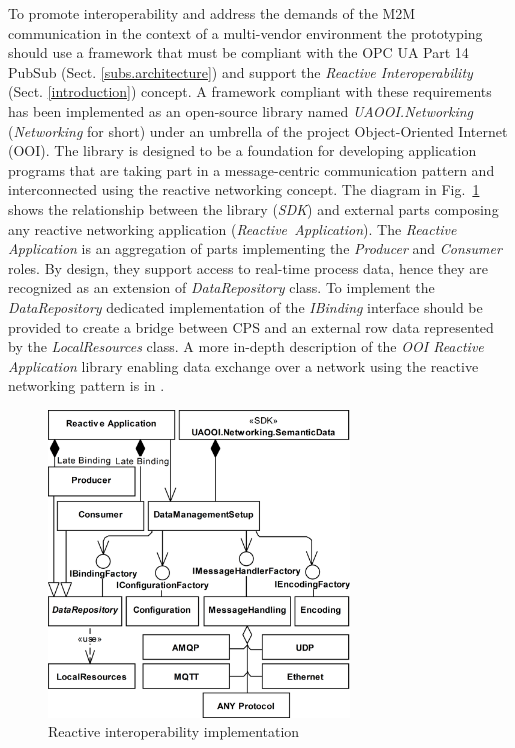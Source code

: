 \documentclass{article}
\begin{document}
To promote interoperability and address the demands of the M2M communication in the context of a multi-vendor environment the prototyping should use a framework that must be compliant with the OPC UA Part 14 PubSub (Sect. \ref{subs.architecture}) and support the \emph{Reactive Interoperability} (Sect. \ref{introduction}) concept. A framework compliant with these requirements has been implemented as an open-source library named \emph{UAOOI.Networking} (\emph{Networking} for short) under an umbrella of the project Object-Oriented Internet  (OOI)\cite{mariusz_postol_2020_4361640}. The library is designed to be a foundation for developing application programs that are taking part in a message-centric communication pattern and interconnected using the reactive networking concept. The diagram in Fig.~\ref{figure2.UADataApplicationArchitecture} shows the relationship between the library (\emph{SDK}) and external parts composing any reactive networking application (\emph{Reactive\ Application}). The \emph{Reactive Application} is an aggregation of parts implementing the \emph{Producer} and \emph{Consumer} roles. By design, they support access to real-time process data, hence they are recognized as an extension of \emph{DataRepository} class. To implement the \emph{DataRepository} dedicated implementation of the \emph{IBinding} interface should be provided to create a bridge between CPS and an external row data represented by the \emph{LocalResources} class. A more in-depth description of the \emph{OOI Reactive Application} library enabling data exchange over a network using the reactive networking pattern is in \cite{mpostol2020}.

\begin{figure}
      \centering
      \includegraphics[width=8cm]{../../.Media/UADataApplicationArchitecture.png}
      \caption{Reactive interoperability implementation}\label{figure2.UADataApplicationArchitecture}
\end{figure}
\end{document}
